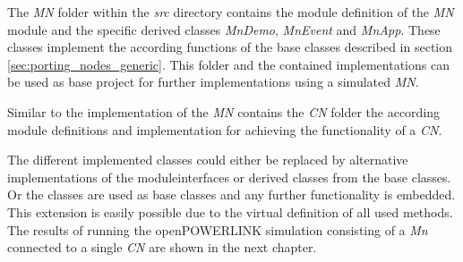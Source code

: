 The \emph{MN} folder within the \emph{src} directory contains the module definition of the \emph{MN} module and the specific derived classes \emph{MnDemo}, \emph{MnEvent} and \emph{MnApp}.
These classes implement the according functions of the base classes described in section \ref{sec:porting_nodes_generic}.
This folder and the contained implementations can be used as base project for further implementations using a simulated \emph{MN}.

Similar to the implementation of the \emph{MN} contains the \emph{CN} folder the according module definitions and implementation for achieving the functionality of a \emph{CN}.

The different implemented classes could either be replaced by alternative implementations of the moduleinterfaces or derived classes from the base classes.
Or the classes are used as base classes and any further functionality is embedded.
This extension is easily possible due to the virtual definition of all used methods.
\\

The results of running the openPOWERLINK simulation consisting of a \emph{Mn} connected to a single \emph{CN} are shown in the next chapter.